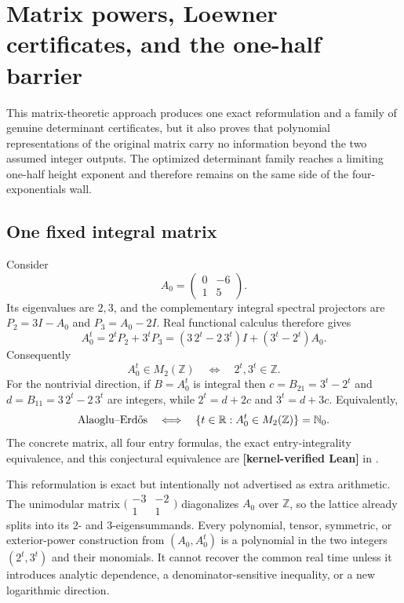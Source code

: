 \documentclass[11pt,oneside]{article}
\theoremstyle{definition}
\theoremstyle{remark}
\newcommand{\Nzero}{\mathbb N_0}
\newcommand{\Z}{\mathbb Z}
\newcommand{\R}{\mathbb R}
\newcommand{\lean}[1]{\texttt{\detokenize{#1}}}
\newcommand{\statuslean}{\textcolor{leanblue}{\textbf{[kernel-verified Lean]}}}
\begin{document}
\section{Matrix powers, Loewner certificates, and the one-half barrier}
\label{sec:matrix-loewner}

This matrix-theoretic approach produces
one exact reformulation and a family of genuine determinant certificates, but it also proves
that polynomial representations of the original matrix carry no information beyond the two
assumed integer outputs.  The optimized determinant family reaches a limiting one-half height
exponent and therefore remains on the same side of the four-exponentials wall.

\subsection{One fixed integral matrix}
\label{ml:fixed-matrix}

Consider
\begin{equation}
 A_0=\begin{pmatrix}0&-6\\1&5\end{pmatrix}.
 \label{ml:eq-matrix}
\end{equation}
Its eigenvalues are $2,3$, and the complementary integral spectral projectors are
$P_2=3I-A_0$ and $P_3=A_0-2I$.  Real functional calculus therefore gives
\begin{equation}
 A_0^t=2^tP_2+3^tP_3
 =(3\,2^t-2\,3^t)I+(3^t-2^t)A_0.
 \label{ml:eq-real-power}
\end{equation}
Consequently
\begin{equation}
 A_0^t\in M_2(\Z)
 \quad\Longleftrightarrow\quad
 2^t,3^t\in\Z.
 \label{ml:eq-integral-power-iff}
\end{equation}
For the nontrivial direction, if $B=A_0^t$ is integral then
$c=B_{21}=3^t-2^t$ and $d=B_{11}=3\,2^t-2\,3^t$ are integers, while
$2^t=d+2c$ and $3^t=d+3c$.  Equivalently,
\[
 \text{Alaoglu--Erd\H{o}s}
 \quad\Longleftrightarrow\quad
 \{t\in\R:A_0^t\in M_2(\Z)\}=\Nzero.
\]
The concrete matrix, all four entry formulas, the exact entry-integrality equivalence, and
this conjectural equivalence are \statuslean{} in \lean{IntegralPowerMatrix}.

This reformulation is exact but intentionally not advertised as extra arithmetic.  The
unimodular matrix
$\bigl(\begin{smallmatrix}-3&-2\\1&1\end{smallmatrix}\bigr)$ diagonalizes $A_0$ over
$\Z$, so the lattice already splits into its $2$- and $3$-eigensummands.  Every polynomial,
tensor, symmetric, or exterior-power construction from $(A_0,A_0^t)$ is a polynomial in the
two integers $(2^t,3^t)$ and their monomials.  It cannot recover the common real time unless it
introduces analytic dependence, a denominator-sensitive inequality, or a new logarithmic
direction.
\end{document}
